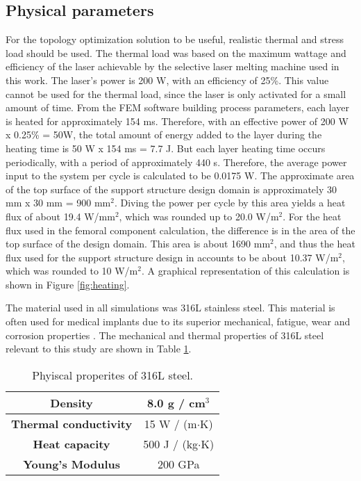 \documentclass[../main.tex]{subfiles}
\begin{document}
\subsection{Physical parameters}

For the topology optimization solution to be useful, realistic thermal and stress load should be used. The thermal load was based on the maximum wattage and efficiency of the laser achievable by the selective laser melting machine used in this work. The laser's power is 200 W, with an efficiency of 25\%. This value cannot be used for the thermal load, since the laser is only activated for a small amount of time. From the FEM software building process parameters, each layer is heated for approximately 154 ms. Therefore, with an effective power of 200 W x 0.25\% = 50W, the total amount of energy added to the layer during the heating time is 50 W x 154 ms = 7.7 J. But each layer heating time occurs periodically, with a period of approximately 440 s. Therefore, the average power input to the system per cycle is calculated to be 0.0175 W. The approximate area of the top surface of the support structure design domain is approximately 30 mm x 30 mm = 900 mm$^2$. Diving the power per cycle by this area yields a heat flux of about 19.4 W/mm$^2$, which was rounded up to 20.0 W/m$^2$. For the heat flux used in the femoral component calculation, the difference is in the area of the top surface of the design domain. This area is about 1690 mm$^2$, and thus the heat flux used for the support structure design in accounts to be about 10.37 W/m$^2$, which was rounded to 10 W/m$^2$. A graphical representation of this calculation is shown in Figure \ref{fig:heating}.

The material used in all simulations was 316L stainless steel. This material is often used for medical implants due to its superior mechanical, fatigue, wear and corrosion properties \cite{davisComprehensiveReviewMetallic2022}. The mechanical and thermal properties of 316L steel relevant to this study are shown in Table \ref{tab:316l}.

\begin{table}[h!]
  \centering
  \begin{tabular} { |c | c| }
    \hline
    \textbf{Density} & 8.0 g / cm$^3$ \\
    \hline
    \textbf{Thermal conductivity} & 15 W / (m$\cdot$K) \\
    \hline
    \textbf{Heat capacity} & 500 J / (kg$\cdot$K) \\
    \hline
    \textbf{Young's Modulus} & 200 GPa \\
    \hline
  \end{tabular}
  \caption{Phyiscal properites of 316L steel.}
  \label{tab:316l}
\end{table}
\end{document}
